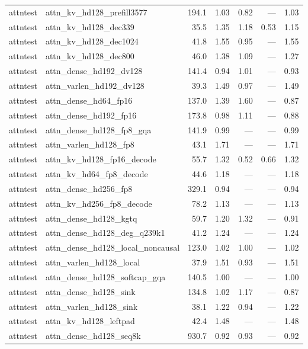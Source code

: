 \begin{longtable}{@{}llrrrrr@{}}
attntest & attn\_kv\_hd128\_prefill3577 & 194.1 & 1.03 & 0.82 & --- & 1.03 \\
attntest & attn\_kv\_hd128\_dec339 & 35.5 & 1.35 & 1.18 & 0.53 & 1.15 \\
attntest & attn\_kv\_hd128\_dec1024 & 41.8 & 1.55 & 0.95 & --- & 1.55 \\
attntest & attn\_kv\_hd128\_dec800 & 46.0 & 1.38 & 1.09 & --- & 1.27 \\
attntest & attn\_dense\_hd192\_dv128 & 141.4 & 0.94 & 1.01 & --- & 0.93 \\
attntest & attn\_varlen\_hd192\_dv128 & 39.3 & 1.49 & 0.97 & --- & 1.49 \\
attntest & attn\_dense\_hd64\_fp16 & 137.0 & 1.39 & 1.60 & --- & 0.87 \\
attntest & attn\_dense\_hd192\_fp16 & 173.8 & 0.98 & 1.11 & --- & 0.88 \\
attntest & attn\_dense\_hd128\_fp8\_gqa & 141.9 & 0.99 & --- & --- & 0.99 \\
attntest & attn\_varlen\_hd128\_fp8 & 43.1 & 1.71 & --- & --- & 1.71 \\
attntest & attn\_kv\_hd128\_fp16\_decode & 55.7 & 1.32 & 0.52 & 0.66 & 1.32 \\
attntest & attn\_kv\_hd64\_fp8\_decode & 44.6 & 1.18 & --- & --- & 1.18 \\
attntest & attn\_dense\_hd256\_fp8 & 329.1 & 0.94 & --- & --- & 0.94 \\
attntest & attn\_kv\_hd256\_fp8\_decode & 78.2 & 1.13 & --- & --- & 1.13 \\
attntest & attn\_dense\_hd128\_kgtq & 59.7 & 1.20 & 1.32 & --- & 0.91 \\
attntest & attn\_dense\_hd128\_deg\_q239k1 & 41.2 & 1.24 & --- & --- & 1.24 \\
attntest & attn\_dense\_hd128\_local\_noncausal & 123.0 & 1.02 & 1.00 & --- & 1.02 \\
attntest & attn\_varlen\_hd128\_local & 37.9 & 1.51 & 0.93 & --- & 1.51 \\
attntest & attn\_dense\_hd128\_softcap\_gqa & 140.5 & 1.00 & --- & --- & 1.00 \\
attntest & attn\_dense\_hd128\_sink & 134.8 & 1.02 & 1.17 & --- & 0.87 \\
attntest & attn\_varlen\_hd128\_sink & 38.1 & 1.22 & 0.94 & --- & 1.22 \\
attntest & attn\_kv\_hd128\_leftpad & 42.4 & 1.48 & --- & --- & 1.48 \\
attntest & attn\_dense\_hd128\_seq8k & 930.7 & 0.92 & 0.93 & --- & 0.92 \\

\end{longtable}
